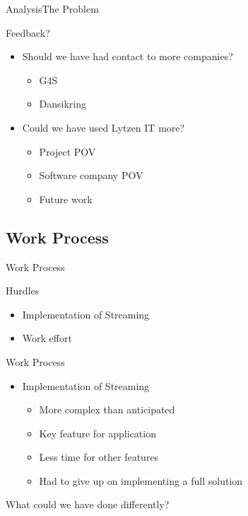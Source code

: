 \begin{frame}{Analysis}{The Problem}
    \begin{block}{Feedback?}
    \begin{itemize}
        \item Should we have had contact to more companies?
        \begin{itemize}
            \item G4S
            \item Dansikring
        \end{itemize}
        \item Could we have used Lytzen IT more?
        \begin{itemize}
            \item Project POV
            \item Software company POV
            \item Future work
        \end{itemize}
    \end{itemize}
    \end{block}
\end{frame}

\subsection{Work Process}
\begin{frame}{Work Process}
    \begin{block}{Hurdles}
    \begin{itemize}
        \item Implementation of Streaming
        \item Work effort
    \end{itemize}
    \end{block}
\end{frame}

\begin{frame}{Work Process}
    \begin{itemize}
        \item Implementation of Streaming
        \begin{itemize}
            \item More complex than anticipated
            \item Key feature for application
            \item Less time for other features
            \item Had to give up on implementing a full solution
        \end{itemize}
    \end{itemize}
    What could we have done differently?
\end{frame}

